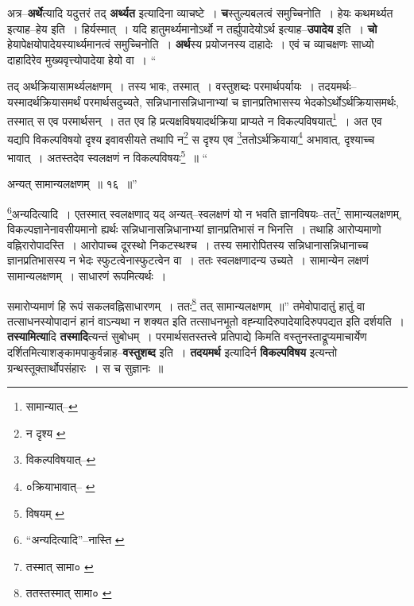 \documentclass[article,12pt,a4paper]{memoir}
\begin{document}
	  \pstart अत्र--\textbf{अर्थे}त्यादि यदुत्तरं तद् \textbf{अर्थ्यत} इत्यादिना व्याचष्टे । \textbf{च}स्तुल्यबलत्वं समुच्चिनोति । हेयः कथमर्थ्यत इत्याह--हेय इति । हिर्यस्मात् । यदि हातुमर्थ्यमानोऽर्थो न तर्ह्युपादेयोऽर्थ इत्याह--\textbf{उपादेय} इति । \textbf{चो} हेयापेक्षयोपादेयस्यार्थ्यमानत्वं समुच्चिनोति । \textbf{अर्थ}स्य प्रयोजनस्य दाहादेः । एवं च व्याचक्षणः साध्यो दाहादिरेव मुख्यवृत्त्योपादेया हेयो वा । \leavevmode{} “
	  
	तद् अर्थक्रियासामर्थ्यलक्षणम् । तस्य भावः, तस्मात् । वस्तुशब्दः परमार्थपर्यायः । तदयमर्थः--यस्मादर्थक्रियासमर्थं परमार्थसदुच्यते, सन्निधानासन्निधानाभ्यां च ज्ञानप्रतिभासस्य भेदकोऽर्थोऽर्थक्रियासमर्थः, तस्मात् स एव परमार्थसन् । तत एव हि प्रत्यक्षविषयादर्थक्रिया प्राप्यते न विकल्पविषयात्\footnote{सामान्यात्--\cite{dp-msD-n}} । अत एव यद्यपि विकल्पविषयो दृश्य इवावसीयते तथापि न\footnote{न दृश्य \cite{dp-msA} \cite{dp-msB} \cite{dp-edP} \cite{dp-edH} \cite{dp-edE} \cite{dp-edN}} स दृश्य एव \footnote{विकल्पविषयात्--\cite{dp-msD-n}}\-ततोऽर्थक्रियाया\footnote{०क्रियाभावात्--\cite{dp-msA} \cite{dp-msB} \cite{dp-edP} \cite{dp-edH} \cite{dp-edE} \cite{dp-edN}} अभावात्, दृश्याच्च भावात् । अतस्तदेव स्वलक्षणं न विकल्पविषयः\footnote{विषयम् \cite{dp-msA} \cite{dp-msB} \cite{dp-edP} \cite{dp-edH} \cite{dp-edE} \cite{dp-edN}} ॥ “
	  
	अन्यत् सामान्यलक्षणम् ॥ १६ ॥” 
	  
	\footnote{“अन्यदित्यादि”--नास्ति \cite{dp-msA} \cite{dp-edP} \cite{dp-edH} \cite{dp-edE} \cite{dp-edN}}\-अन्यदित्यादि । एतस्मात् स्वलक्षणाद् यद् अन्यत्--स्वलक्षणं यो न भवति ज्ञानविषयः--तत्\footnote{तस्मात् सामा० \cite{dp-msB}} सामान्यलक्षणम्, विकल्पज्ञानेनावसीयमानो ह्यर्थः सन्निधानासन्निधानाभ्यां ज्ञानप्रतिभासं न भिनत्ति । तथाहि आरोप्यमाणो वह्निरारोपादस्ति । आरोपाच्च दूरस्थो निकटस्थश्च । तस्य समारोपितस्य सन्निधानासन्निधानाच्च ज्ञानप्रतिभासस्य न भेदः स्फुटत्वेनास्फुटत्वेन वा । ततः स्वलक्षणादन्य उच्यते । सामान्येन लक्षणं सामान्यलक्षणम् । साधारणं रूपमित्यर्थः । 
	  
	समारोप्यमाणं हि रूपं सकलवह्निसाधारणम् । ततः\footnote{ततस्तस्मात् सामा० \cite{dp-msB}} तत् सामान्यलक्षणम् ॥” तमेवोपादातुं हातुं वा तत्साधनस्योपादानं हानं वाऽन्यथा न शक्यत इति तत्साधनभूतो वह्न्यादिरुपादेयादिरुपपद्यत इति दर्शयति । \textbf{तस्यामित्या}दि \textbf{तस्मादि}त्यन्तं सुबोधम् । परमार्थसतस्तत्त्वे प्रतिपाद्ये किमति वस्तुनस्ताद्रूप्यमाचार्येण दर्शितमित्याशङ्कामपाकुर्वन्नाह--\textbf{वस्तुशब्द} इति । \textbf{तदयमर्थ} इत्यादिर्न \textbf{विकल्पविषय} इत्यन्तो ग्रन्थस्तूक्तार्थोपसंहारः । स च सुज्ञानः ॥
	\pend
      
\end{document}
